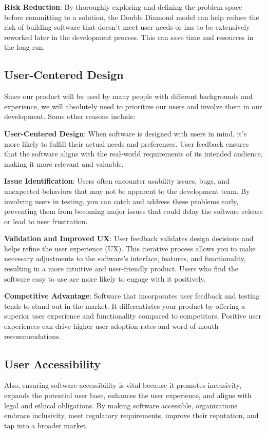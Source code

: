 \documentclass[ansiapaper,12pt]{article}
\begin{document}
\textbf{Risk Reduction}: By thoroughly exploring and defining the problem space before committing to a solution, the Double Diamond model can help reduce the risk of building software that doesn't meet user needs or has to be extensively reworked later in the development process. This can save time and resources in the long run.

\subsection{User-Centered Design}

Since our product will be used by many people with different backgrounds and experience, we will absolutely need to prioritize our users and involve them in our development.
Some other reasons include:

\textbf{User-Centered Design}: When software is designed with users in mind, it's more likely to fulfill their actual needs and preferences. User feedback ensures that the software aligns with the real-world requirements of its intended audience, making it more relevant and valuable.

\textbf{Issue Identification}: Users often encounter usability issues, bugs, and unexpected behaviors that may not be apparent to the development team. By involving users in testing, you can catch and address these problems early, preventing them from becoming major issues that could delay the software release or lead to user frustration.

\textbf{Validation and Improved UX}: User feedback validates design decisions and helps refine the user experience (UX). This iterative process allows you to make necessary adjustments to the software's interface, features, and functionality, resulting in a more intuitive and user-friendly product. Users who find the software easy to use are more likely to engage with it positively.

\textbf{Competitive Advantage}: Software that incorporates user feedback and testing tends to stand out in the market. It differentiates your product by offering a superior user experience and functionality compared to competitors. Positive user experiences can drive higher user adoption rates and word-of-mouth recommendations.

\subsection{User Accessibility}

Also, ensuring software accessibility is vital because it promotes inclusivity,
expands the potential user base, enhances the user experience, and aligns with legal and ethical obligations.
By making software accessible, organizations embrace inclusivity, meet regulatory requirements,
improve their reputation, and tap into a broader market.
\end{document}
